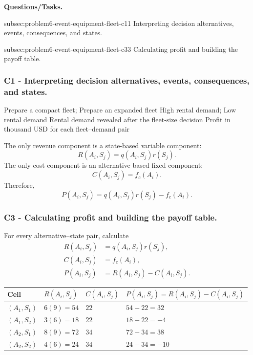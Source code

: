 \textbf{Questions/Tasks.}
\begin{enumerate}
	\CriterionTask
	{subsec:problem6-event-equipment-fleet-c1}{1}
	{Interpreting decision alternatives, events, consequences, and states.}

	\CriterionTask
	{subsec:problem6-event-equipment-fleet-c3}{3}
	{Calculating profit and building the payoff table.}
\end{enumerate}

\subsubsection*{C1 - Interpreting decision alternatives, events, consequences, and states.}
\label{subsec:problem6-event-equipment-fleet-c1}

\DecisionElementsTable
{Prepare a compact fleet; Prepare an expanded fleet}
{High rental demand; Low rental demand}
{Rental demand revealed after the fleet-size decision}
{Profit in thousand USD for each fleet--demand pair}

The only revenue component is a state-based variable component:
\[
R(A_i,S_j)=q(A_i,S_j)r(S_j).
\]
The only cost component is an alternative-based fixed component:
\[
C(A_i,S_j)=f_c(A_i).
\]
Therefore,
\[
P(A_i,S_j)
=
q(A_i,S_j)r(S_j)
-
f_c(A_i).
\]


\subsubsection*{C3 - Calculating profit and building the payoff table.}
\label{subsec:problem6-event-equipment-fleet-c3}

For every alternative--state pair, calculate
\[
\begin{aligned}
	R(A_i,S_j)&=q(A_i,S_j)r(S_j),
	\\
	C(A_i,S_j)&=f_c(A_i),
	\\
	P(A_i,S_j)&=R(A_i,S_j)-C(A_i,S_j).
\end{aligned}
\]

\begin{center}
	\small
	\begin{tabular}{llll}
		\toprule
		Cell
		& \(R(A_i,S_j)\)
		& \(C(A_i,S_j)\)
		& \(P(A_i,S_j)=R(A_i,S_j)-C(A_i,S_j)\) \\
		\midrule
		\((A_1,S_1)\)
		& \(6(9)=54\)
		& \(22\)
		& \(54-22=32\) \\
		
		\((A_1,S_2)\)
		& \(3(6)=18\)
		& \(22\)
		& \(18-22=-4\) \\
		
		\((A_2,S_1)\)
		& \(8(9)=72\)
		& \(34\)
		& \(72-34=38\) \\
		
		\((A_2,S_2)\)
		& \(4(6)=24\)
		& \(34\)
		& \(24-34=-10\) \\
		\bottomrule
	\end{tabular}
\end{center}

